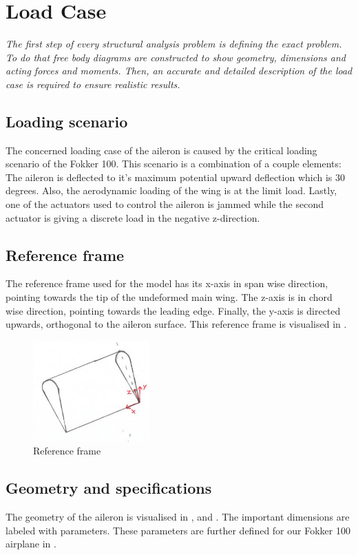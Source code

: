 \section{Load Case}
\label{sec:loading}

\textit{The first step of every structural analysis problem is defining the exact problem. To do that free body diagrams are constructed to show geometry, dimensions and acting forces and moments. Then, an accurate and detailed description of the load case is required to ensure realistic results.}

\subsection{Loading scenario}
The concerned loading case of the aileron is caused by the critical loading scenario of the Fokker 100. This scenario is a combination of a couple elements: The aileron is deflected to it's maximum potential upward deflection which is 30 degrees. Also, the aerodynamic loading of the wing is at the limit load. Lastly, one of the actuators used to control the aileron is jammed while the second actuator is giving a discrete load in the negative z-direction.

\subsection{Reference frame}
The reference frame used for the model has its x-axis in span wise direction, pointing towards the tip of the undeformed main wing. The z-axis is in chord wise direction, pointing towards the leading edge. Finally, the y-axis is directed upwards, orthogonal to the aileron surface. This reference frame is visualised in .

\begin{figure}[H]
    \centering
    \includegraphics[width=4.5cm]{Images/reference_frame.jpg}
    \caption{Reference frame}
    \label{reference_frame}
\end{figure}


\subsection{Geometry and specifications}
The geometry of the aileron is visualised in ,  and . The important dimensions are labeled with parameters. These parameters are further defined for our Fokker 100 airplane in .



